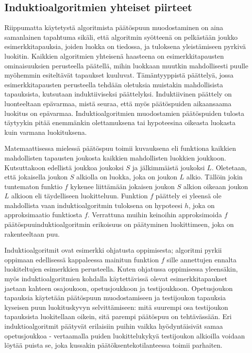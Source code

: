 \documentclass[12pt,finnish]{tktltiki2}
\theoremstyle{definition}
\theoremstyle{remark}
\begin{document}
\subsection{Induktioalgoritmien yhteiset piirteet}
Riippumatta käytetystä algoritmista päätöspuun muodostaminen on aina samanlainen tapahtuma sikäli,
että algoritmin syötteenä on pelkästään joukko esimerkkitapauksia, joiden luokka on tiedossa, ja
tuloksena yleistämiseen pyrkivä luokitin. Kaikkien algoritmien yhteisenä haasteena on esimerkkitapausten
ominaisuuksien perusteella päätellä, mihin luokkaan muutkin mahdollisesti puulle myöhemmin
esiteltävät tapaukset kuuluvat. Tämäntyyppistä päättelyä, jossa esimerkkitapausten perusteella
tehdään oletuksia muistakin mahdollisista tapauksista, kutsutaan induktiiviseksi päättelyksi.
Induktiivinen päättely on luonteeltaan epävarmaa, mistä seuraa, että myös päätöspuiden
aikaansaama luokitus on epävarmaa. Induktioalgoritmien muodostamien päätöspuiden tulosta
täytyykin pitää enemmänkin olettamuksena tai hypoteesina oikeasta luokasta kuin
varmana luokituksena.

Matemaattisessa mielessä päätöspuu toimii kuvauksena eli funktiona kaikkien mahdollisten
tapausten joukosta kaikkien mahdollisten luokkien joukkoon. Kutsuttakoon edellistä joukkoa
joukoksi $S$ ja jälkimmäistä joukoksi $L$. Oletetaan, että jokaisella joukon $S$ alkiolla on
luokka, joka on joukon $L$ alkio. Tällöin jokin tuntematon funktio $f$ kykenee liittämään
jokaisen joukon $S$ alkion oikeaan joukon $L$ alkioon eli täydelliseen luokitteluun.
Funktion $f$ päättely ei yleensä ole mahdollista vaan induktioalgoritmin tuloksena on
hypoteesi $h$, joka on approksimaatio funktiosta $f$. Verrattuna muihin keinoihin approksimoida
$f$ päätöspuuinduktioalgoritmin erikoisuus on päätyminen luokittimeen, joka on rakenteeltaan puu.

Induktioalgoritmit ovat esimerkki ohjatusta oppimisesta; algoritmi pyrkii oppimaan edellisessä
kappaleessa mainitun funktion $f$ sille annettujen ennalta luokiteltujen esimerkkien perusteella. 
Kuten ohjatussa oppimisessa yleensäkin, myös induktioalgoritmien kohdalla käytettävissä olevat
esimerkkitapaukset jaetaan kahteen osajoukoon, opetusjoukkoon ja testijoukkoon. Opetusjoukon
tapauksia käytetään päätöspuun muodostamiseen ja testijoukon tapauksia kyseisen
puun luokituskyvyn selvittämiseen: mitä suurempi osa testijoukon tapauksista luokitellaan oikein,
sitä parempi päätöspuu on tehtävässään. Eri induktioalgoritmit päätyvät erilaisiin puihin vaikka
hyödyntäisivät samaa opetusjoukkoa - vertaamalla puiden luokittelukykyä testijoukon alkioilla
voidaan löytää puista se, joka kussakin päätöksentekotilanteessa toimii parhaiten.
\end{document}
